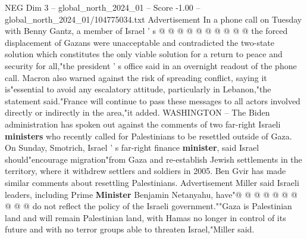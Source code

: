 \begin{textsample}{NEG Dim 3 – global\_north\_2024\_01 – Score -1.00 – global\_north\_2024\_01/104775034.txt}
Advertisement In a phone call on Tuesday with Benny Gantz, a member of Israel ' s @ @ @ @ @ @ @ @ @ @ the forced displacement of Gazans were unacceptable and contradicted the two-state solution which constitutes the only viable solution for a return to peace and security for all,"the president ' s office said in an overnight readout of the phone call.
Macron also warned against the risk of spreading conflict, saying it is"essential to avoid any escalatory attitude, particularly in Lebanon,"the statement said."France will continue to pass these messages to all actors involved directly or indirectly in the area,"it added.
WASHINGTON -- The Biden administration has spoken out against the comments of two far-right Israeli \textbf{ministers} who recently called for Palestinians to be resettled outside of Gaza.
On Sunday, Smotrich, Israel ' s far-right finance \textbf{minister}, said Israel should"encourage migration"from Gaza and re-establish Jewish settlements in the territory, where it withdrew settlers and soldiers in 2005.
Ben Gvir has made similar comments about resettling Palestinians.
Advertisement Miller said Israeli leaders, including Prime \textbf{Minister} Benjamin Netanyahu, have"@ @ @ @ @ @ @ @ @ @ do not reflect the policy of the Israeli government.""Gaza is Palestinian land and will remain Palestinian land, with Hamas no longer in control of its future and with no terror groups able to threaten Israel,"Miller said.

\end{textsample}
